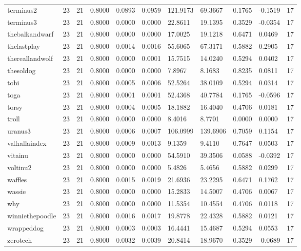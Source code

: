 \begin{table}[htbp]
\begin{tabular}{lllllllllll}
terminus2 & 23 & 21 & 0.8000 & 0.0893 & 0.0959 & 121.9173 & 69.3667 & 0.1765 & -0.1519 & 17 \\
terminus3 & 23 & 21 & 0.8000 & 0.0000 & 0.0000 & 22.8611 & 19.1395 & 0.3529 & -0.0354 & 17 \\
thebalkandwarf & 23 & 21 & 0.8000 & 0.0000 & 0.0000 & 17.0025 & 19.1218 & 0.6471 & 0.0469 & 17 \\
thelastplay & 23 & 21 & 0.8000 & 0.0014 & 0.0016 & 55.6065 & 67.3171 & 0.5882 & 0.2905 & 17 \\
thereallandwolf & 23 & 21 & 0.8000 & 0.0000 & 0.0001 & 15.7515 & 14.0240 & 0.5294 & 0.0402 & 17 \\
thesoldog & 23 & 21 & 0.8000 & 0.0000 & 0.0000 & 7.8967 & 8.1683 & 0.8235 & 0.0811 & 17 \\
tobi & 23 & 21 & 0.8000 & 0.0005 & 0.0006 & 52.5264 & 38.0109 & 0.5294 & 0.0314 & 17 \\
toga & 23 & 21 & 0.8000 & 0.0001 & 0.0001 & 52.4368 & 40.7784 & 0.1765 & -0.0596 & 17 \\
torsy & 23 & 21 & 0.8000 & 0.0004 & 0.0005 & 18.1882 & 16.4040 & 0.4706 & 0.0181 & 17 \\
troll & 23 & 21 & 0.8000 & 0.0000 & 0.0000 & 8.4016 & 8.7701 & 0.0000 & 0.0000 & 17 \\
uranus3 & 23 & 21 & 0.8000 & 0.0006 & 0.0007 & 106.0999 & 139.6906 & 0.7059 & 0.1154 & 17 \\
valhallaindex & 23 & 21 & 0.8000 & 0.0009 & 0.0013 & 9.1359 & 9.4110 & 0.7647 & 0.0503 & 17 \\
vitainu & 23 & 21 & 0.8000 & 0.0000 & 0.0000 & 54.5910 & 39.3506 & 0.0588 & -0.0392 & 17 \\
voltinu2 & 23 & 21 & 0.8000 & 0.0000 & 0.0000 & 5.4826 & 5.4656 & 0.5882 & 0.0299 & 17 \\
waffles & 23 & 21 & 0.8000 & 0.0015 & 0.0019 & 21.6936 & 23.2295 & 0.6471 & 0.1762 & 17 \\
wassie & 23 & 21 & 0.8000 & 0.0000 & 0.0000 & 15.2833 & 14.5007 & 0.4706 & 0.0067 & 17 \\
why & 23 & 21 & 0.8000 & 0.0000 & 0.0000 & 11.5354 & 10.4554 & 0.4706 & 0.0118 & 17 \\
winniethepoodle & 23 & 21 & 0.8000 & 0.0016 & 0.0017 & 19.8778 & 22.4328 & 0.5882 & 0.0121 & 17 \\
wrappeddog & 23 & 21 & 0.8000 & 0.0003 & 0.0003 & 16.4441 & 15.4687 & 0.5294 & 0.0553 & 17 \\
zerotech & 23 & 21 & 0.8000 & 0.0032 & 0.0039 & 20.8414 & 18.9670 & 0.3529 & -0.0689 & 17 \\

\end{tabular}
\end{table}
